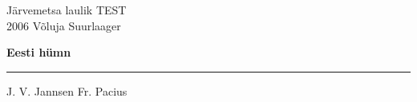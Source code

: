 \documentclass[10pt]{book}
\begin{document}
\rmfamily

\begin{titlepage}
  \null
  \begin{center}
    \vspace{1.5in}
    {\LARGE Järvemetsa laulik TEST }\\
    { 2006 Võluja Suurlaager }
    \vfill
  \end{center}
\end{titlepage}

\clearpage

{
  \samepage
  \raggedbottom
  \raggedright
  \sloppy


  \vspace{0.2in}
  \centerline{ {\bf {\large Eesti h\"umn } } }
  \nopagebreak[4]
  \vspace{0.1in}
  \nopagebreak[4]
  \hrule height 0.05ex
  \nopagebreak[4]
  \vspace{-0.05in}

  {\footnotesize J. V. Jannsen \hfill Fr. Pacius }\\
  \vspace{0.01in}


  \vspace{0.01in}
  \nopagebreak[4]
  {%
\parindent 0pt
\noindent
\ifx\preLilyPondExample \undefined
\else
  \expandafter\preLilyPondExample
\fi
\def\lilypondbook{}%

\ifx\postLilyPondExample \undefined
\else
  \expandafter\postLilyPondExample
\fi
}

}
\end{document}
